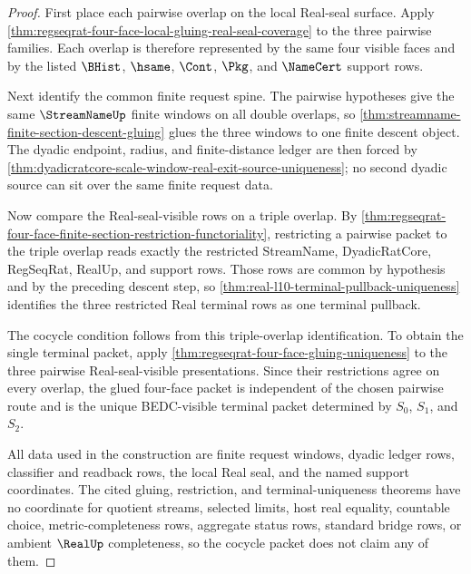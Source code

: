 \begin{proof}
First place each pairwise overlap on the local Real-seal surface. Apply
\autoref{thm:regseqrat-four-face-local-gluing-real-seal-coverage} to the
three pairwise families. Each overlap is therefore represented by the same
four visible faces and by the listed $\BHist$, $\hsame$, $\Cont$, $\Pkg$,
and $\NameCert$ support rows.

Next identify the common finite request spine. The pairwise hypotheses give
the same $\StreamNameUp$ finite windows on all double overlaps, so
\autoref{thm:streamname-finite-section-descent-gluing} glues the three
windows to one finite descent object. The dyadic endpoint, radius, and
finite-distance ledger are then forced by
\autoref{thm:dyadicratcore-scale-window-real-exit-source-uniqueness}; no
second dyadic source can sit over the same finite request data.

Now compare the Real-seal-visible rows on a triple overlap. By
\autoref{thm:regseqrat-four-face-finite-section-restriction-functoriality},
restricting a pairwise packet to the triple overlap reads exactly the
restricted StreamName, DyadicRatCore, RegSeqRat, RealUp, and support rows.
Those rows are common by hypothesis and by the preceding descent step, so
\autoref{thm:real-l10-terminal-pullback-uniqueness} identifies the three
restricted Real terminal rows as one terminal pullback.

The cocycle condition follows from this triple-overlap identification. To
obtain the single terminal packet, apply
\autoref{thm:regseqrat-four-face-gluing-uniqueness} to the three pairwise
Real-seal-visible presentations. Since their restrictions agree on every
overlap, the glued four-face packet is independent of the chosen pairwise
route and is the unique BEDC-visible terminal packet determined by
$S_0$, $S_1$, and $S_2$.

All data used in the construction are finite request windows, dyadic ledger
rows, classifier and readback rows, the local Real seal, and the named
support coordinates. The cited gluing, restriction, and terminal-uniqueness
theorems have no coordinate for quotient streams, selected limits, host real
equality, countable choice, metric-completeness rows, aggregate status rows,
standard bridge rows, or ambient $\RealUp$ completeness, so the cocycle
packet does not claim any of them.
\end{proof}

